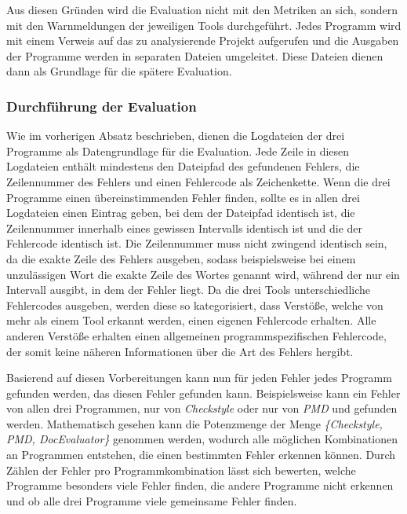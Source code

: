 Aus diesen Gründen wird die Evaluation nicht mit den Metriken an sich, sondern mit den Warnmeldungen der jeweiligen Tools durchgeführt. Jedes Programm wird mit einem Verweis auf das zu analysierende Projekt aufgerufen und die Ausgaben der Programme werden in separaten Dateien umgeleitet.  Diese Dateien dienen dann als Grundlage für die spätere Evaluation. 

\subsubsection{Durchführung der Evaluation}
Wie im vorherigen Absatz beschrieben, dienen die Logdateien der drei Programme als Datengrundlage für die Evaluation. Jede Zeile in diesen Logdateien enthält mindestens den Dateipfad des gefundenen Fehlers, die Zeilennummer des Fehlers und einen Fehlercode als Zeichenkette.  Wenn die drei Programme einen übereinstimmenden Fehler finden, sollte es in allen drei Logdateien einen Eintrag geben, bei dem der Dateipfad identisch ist, die Zeilennummer innerhalb eines gewissen Intervalls identisch ist und die der Fehlercode identisch ist. Die Zeilennummer muss nicht zwingend identisch sein, da  \checkpmd die exakte Zeile des Fehlers ausgeben, sodass beispielsweise bei einem unzulässigen Wort die exakte Zeile des Wortes genannt wird, während der \doceval nur ein Intervall ausgibt, in dem der Fehler liegt. Da die drei Tools unterschiedliche Fehlercodes ausgeben, werden diese so kategorisiert, dass Verstöße, welche von mehr als einem Tool erkannt werden, einen eigenen Fehlercode erhalten. Alle anderen Verstöße erhalten einen allgemeinen programmspezifischen Fehlercode, der somit keine näheren Informationen über die Art des Fehlers hergibt.

Basierend auf diesen Vorbereitungen kann nun für jeden Fehler jedes Programm gefunden werden, das diesen Fehler gefunden kann. Beispielsweise kann ein Fehler von allen drei Programmen, nur von \textit{Checkstyle} oder nur von \textit{PMD} und \doceval gefunden werden. Mathematisch gesehen kann die Potenzmenge der Menge \textit{\{Checkstyle, PMD, DocEvaluator\}} genommen werden, wodurch alle möglichen Kombinationen an Programmen entstehen, die einen bestimmten Fehler erkennen können. Durch Zählen der Fehler pro Programmkombination lässt sich bewerten, welche Programme besonders viele Fehler finden, die andere Programme nicht erkennen und ob alle drei Programme viele gemeinsame Fehler finden. 


